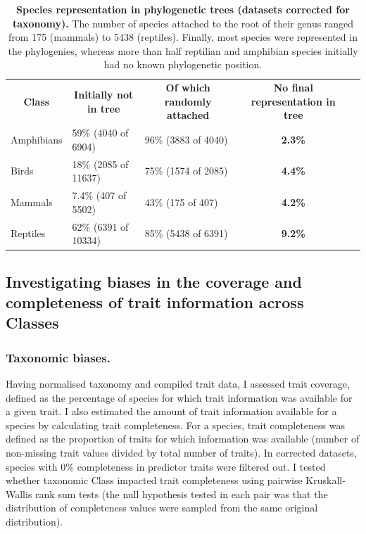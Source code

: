 \begin{table}[h!]
\renewcommand{\baselinestretch}{1}
\renewcommand{\arraystretch}{1.5}
\begin{center}\fontsize{9}{11}\selectfont
\caption[Species representation in phylogenetic trees (datasets corrected for taxonomy)]{\textbf{Species representation in phylogenetic trees (datasets corrected for taxonomy).} The number of species attached to the root of their genus ranged from 175 (mammals) to 5438 (reptiles). Finally, most species were represented in the phylogenies, whereas more than half reptilian and amphibian species initially had no known phylogenetic position.} 
\label{random_attachments_phy}
\begin{tabular}{|l|l|l|c|l}
\cline{1-4}
\multicolumn{1}{|c|}{\textbf{Class}} & \multicolumn{1}{c|}{\textbf{Initially not in tree}} & \multicolumn{1}{c|}{\textbf{Of which randomly attached}} & \textbf{No final representation in tree} &  \\ \cline{1-4}
Amphibians                  & 59\% (4040 of 6904)                           & 96\% (3883 of 4040)                     & \textbf{2.3\%}             &  \\ \cline{1-4}
Birds                       & 18\% (2085 of 11637)                          & 75\% (1574 of 2085)                    & \textbf{4.4\%}             &  \\ \cline{1-4}
Mammals                     & 7.4\% (407 of 5502)                           & 43\% (175 of 407)                       & \textbf{4.2\%}            &  \\ \cline{1-4}
Reptiles                    & 62\% (6391 of 10334)                          & 85\% (5438 of 6391)                    & \textbf{9.2\%}             &  \\ \cline{1-4}
\end{tabular}
\end{center}
\end{table}


\subsection{Investigating biases in the coverage and completeness of trait information across Classes}

\subsubsection{Taxonomic biases.}
Having normalised taxonomy and compiled trait data, I assessed trait coverage, defined as the percentage of species for which trait information was available for a given trait. I also estimated the amount of trait information available for a species by calculating trait completeness. For a species, trait completeness was defined as the proportion of traits for which information was available (number of non-missing trait values divided by total number of traits). In corrected datasets, species with 0\% completeness in predictor traits were filtered out. I tested whether taxonomic Class impacted trait completeness using pairwise Kruskall-Wallis rank sum tests (the null hypothesis tested in each pair was that the distribution of completeness values were sampled from the same original distribution).

